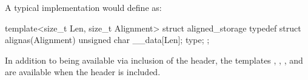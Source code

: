 %
\pnum
\begin{note}
A typical implementation would define  as:

\begin{codeblock}
template<size_t Len, size_t Alignment>
struct aligned_storage {
  typedef struct {
    alignas(Alignment) unsigned char __data[Len];
  } type;
};
\end{codeblock}
\end{note}

\pnum
In addition to being available via inclusion
of the  header, the templates
,
,
, and
are available
when the header  is included.

